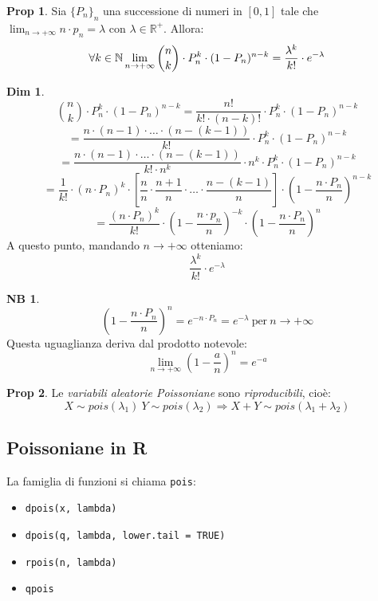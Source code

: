 \documentclass[12pt, a4paper]{report}
\theoremstyle{definition}
\newtheorem*{demonstration}{Dim}
\newtheorem*{proposition}{Prop}
\newtheorem*{note}{NB}
\DeclareRobustCommand{\R}{\mathbb{R}}%
\DeclareRobustCommand{\N}{\mathbb{N}}%
\begin{document}
\begin{proposition}
	Sia \(\{P_n\}_n\) una successione di numeri in $[0,1]$ tale che \(\lim_{n
	\rightarrow +\infty}n\cdot p_n=\lambda\) con \(\lambda\in\R^+\). Allora:
	\[\forall k\in\N\\ \lim_{n\rightarrow +\infty}\binom{n}{k}\cdot P_n^k\cdot (1-P_n)^
	{n-k}=\frac{\lambda^k}{k!}\cdot e^{-\lambda}\]
\end{proposition}

\begin{demonstration}
	\[\binom{n}{k}\cdot P_n^k\cdot (1-P_n)^{n-k}=\frac{n!}{k!\cdot (n-k)!}\cdot P_n^k\cdot (1-P_n)^{n-k}\]
	\[=\frac{n\cdot (n-1)\cdot \dots\cdot (n-(k-1))}{k!}\cdot P_n^k\cdot (1-P_n)^{n-k}\]
	\[=\frac{n\cdot (n-1)\cdot \dots\cdot (n-(k-1))}{k!\cdot n^k}\cdot n^k\cdot P_n^k\cdot (1-P_n)^{n-k}\]
	\[=\frac{1}{k!}\cdot (n\cdot P_n)^k\cdot \left[\frac{n}{n}\cdot \frac{n+1}{n}\cdot \dots\cdot \frac{n-(k-1)}
	{n}\right]\cdot \left(1-{\frac{n\cdot P_n}{n}}\right)^{n-k}\]
	\[=\frac{(n\cdot P_n)^k}{k!}\cdot \left(1-\frac{n\cdot p_n}{n}\right)^{-k}\cdot \left(1-\frac
	{n\cdot P_n}{n}\right)^n\]
	A questo punto, mandando $n\rightarrow +\infty$ otteniamo:
	\[\frac{\lambda^k}{k!}\cdot e^{-\lambda}\]
	\begin{note}
		\[\left(1-\frac{n\cdot P_n}{n}\right)^n=e^{-n\cdot P_n}=e^{-\lambda}\ \text{per}\ n
		\rightarrow +\infty\]
		Questa uguaglianza deriva dal prodotto notevole:
		\[\lim_{n\rightarrow +\infty}\left(1-\frac{a}{n}\right)^n=e^{-a}\]
	\end{note}
\end{demonstration}

\begin{proposition}
	Le \emph{variabili aleatorie Poissoniane} sono \emph{riproducibili}, cioè:
	\[X\sim pois(\lambda_1)\ Y\sim pois(\lambda_2)\Rightarrow X+Y\sim pois(
	\lambda_1+\lambda_2)\]
\end{proposition}

\subsection{Poissoniane in R}
La famiglia di funzioni si chiama \texttt{pois}:
\begin{itemize}
	\item \texttt{dpois(x, lambda)}
	\item \texttt{dpois(q, lambda, lower.tail = TRUE)}
	\item \texttt{rpois(n, lambda)}
	\item \texttt{qpois}
\end{itemize}
\end{document}
